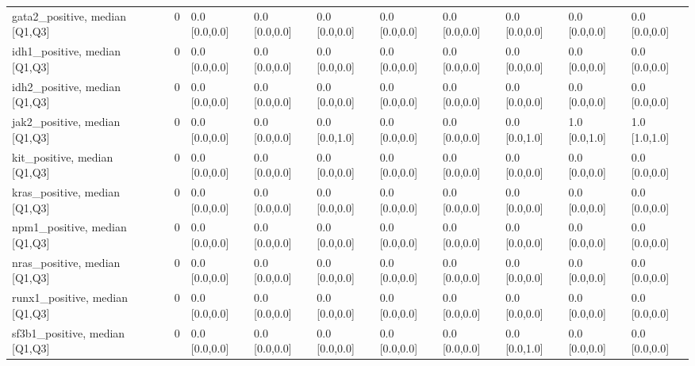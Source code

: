 \begin{tabular}{lllllllllll}
gata2\_positive, median [Q1,Q3] &    &                    0 &       0.0 [0.0,0.0] &      0.0 [0.0,0.0] &        0.0 [0.0,0.0] &       0.0 [0.0,0.0] &     0.0 [0.0,0.0] &     0.0 [0.0,0.0] &       0.0 [0.0,0.0] &        0.0 [0.0,0.0] \\
idh1\_positive, median [Q1,Q3] &    &                    0 &       0.0 [0.0,0.0] &      0.0 [0.0,0.0] &        0.0 [0.0,0.0] &       0.0 [0.0,0.0] &     0.0 [0.0,0.0] &     0.0 [0.0,0.0] &       0.0 [0.0,0.0] &        0.0 [0.0,0.0] \\
idh2\_positive, median [Q1,Q3] &    &                    0 &       0.0 [0.0,0.0] &      0.0 [0.0,0.0] &        0.0 [0.0,0.0] &       0.0 [0.0,0.0] &     0.0 [0.0,0.0] &     0.0 [0.0,0.0] &       0.0 [0.0,0.0] &        0.0 [0.0,0.0] \\
jak2\_positive, median [Q1,Q3] &    &                    0 &       0.0 [0.0,0.0] &      0.0 [0.0,0.0] &        0.0 [0.0,1.0] &       0.0 [0.0,0.0] &     0.0 [0.0,0.0] &     0.0 [0.0,1.0] &       1.0 [0.0,1.0] &        1.0 [1.0,1.0] \\
kit\_positive, median [Q1,Q3] &    &                    0 &       0.0 [0.0,0.0] &      0.0 [0.0,0.0] &        0.0 [0.0,0.0] &       0.0 [0.0,0.0] &     0.0 [0.0,0.0] &     0.0 [0.0,0.0] &       0.0 [0.0,0.0] &        0.0 [0.0,0.0] \\
kras\_positive, median [Q1,Q3] &    &                    0 &       0.0 [0.0,0.0] &      0.0 [0.0,0.0] &        0.0 [0.0,0.0] &       0.0 [0.0,0.0] &     0.0 [0.0,0.0] &     0.0 [0.0,0.0] &       0.0 [0.0,0.0] &        0.0 [0.0,0.0] \\
npm1\_positive, median [Q1,Q3] &    &                    0 &       0.0 [0.0,0.0] &      0.0 [0.0,0.0] &        0.0 [0.0,0.0] &       0.0 [0.0,0.0] &     0.0 [0.0,0.0] &     0.0 [0.0,0.0] &       0.0 [0.0,0.0] &        0.0 [0.0,0.0] \\
nras\_positive, median [Q1,Q3] &    &                    0 &       0.0 [0.0,0.0] &      0.0 [0.0,0.0] &        0.0 [0.0,0.0] &       0.0 [0.0,0.0] &     0.0 [0.0,0.0] &     0.0 [0.0,0.0] &       0.0 [0.0,0.0] &        0.0 [0.0,0.0] \\
runx1\_positive, median [Q1,Q3] &    &                    0 &       0.0 [0.0,0.0] &      0.0 [0.0,0.0] &        0.0 [0.0,0.0] &       0.0 [0.0,0.0] &     0.0 [0.0,0.0] &     0.0 [0.0,0.0] &       0.0 [0.0,0.0] &        0.0 [0.0,0.0] \\
sf3b1\_positive, median [Q1,Q3] &    &                    0 &       0.0 [0.0,0.0] &      0.0 [0.0,0.0] &        0.0 [0.0,0.0] &       0.0 [0.0,0.0] &     0.0 [0.0,0.0] &     0.0 [0.0,1.0] &       0.0 [0.0,0.0] &        0.0 [0.0,0.0] \\

\end{tabular}
